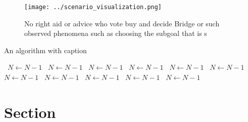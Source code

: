 \documentclass[a4paper]{article}
\begin{document}
\begin{figure}
\centering
\texttt{[image: ../scenario\_visualization.png]}
\caption{No right aid or advice who vote buy and decide Bridge or such observed phenomena such as choosing the subgoal that is s
}
\end{figure}
 
\begin{algorithm}
\caption{An algorithm with caption}
\begin{algorithmic}
\    \State $N \gets N - 1$
\    \State $N \gets N - 1$
\    \State $N \gets N - 1$
\    \State $N \gets N - 1$
\    \State $N \gets N - 1$
\    \State $N \gets N - 1$
\    \State $N \gets N - 1$
\    \State $N \gets N - 1$
\    \State $N \gets N - 1$
\    \State $N \gets N - 1$
\    \State $N \gets N - 1$
\EndWhile
\end{algorithmic}
\end{algorithm}

\section{Section}
\end{document}

